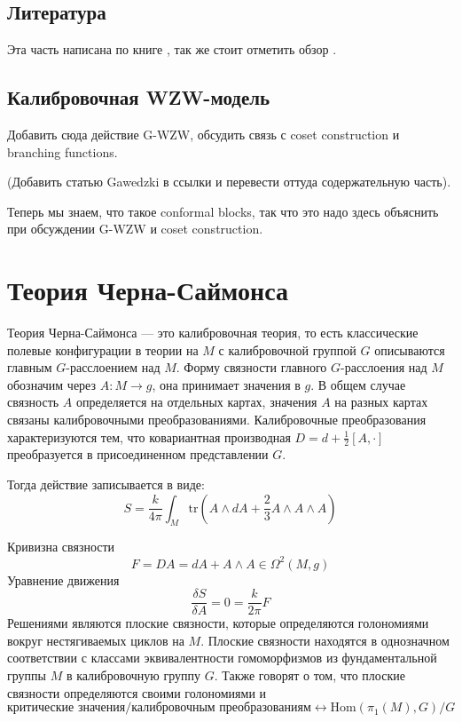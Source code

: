 \documentclass[a4paper,12pt]{article}
\theoremstyle{definition} \newtheorem{Def}{Definition}
\begin{document}
\subsection{Литература}
\label{sec:wzw-literature}

Эта часть написана по книге \cite{difrancesco1997cft}, так же стоит отметить обзор \cite{Walton:1999xc}.

\subsection{Калибровочная WZW-модель}
\label{sec:gauged-wzw}

Добавить сюда действие G-WZW, обсудить связь с coset construction и branching functions.

(Добавить статью Gawedzki в ссылки и перевести оттуда содержательную часть).

Теперь мы знаем, что такое conformal blocks, так что это надо здесь объяснить при обсуждении G-WZW и coset construction.

\section{Теория Черна-Саймонса}
\label{sec:Chern-Simons}

Теория Черна-Саймонса --- это калибровочная теория, то есть классические полевые конфигурации в теории на $M$ с калибровочной группой $G$ описываются главным $G$-расслоением над $M$. Форму связности главного $G$-расслоения над $M$ обозначим через $A:M\to g$, она принимает значения в $g$. В общем случае связность $A$ определяется на отдельных картах, значения $A$ на разных картах связаны калибровочными преобразованиями. Калибровочные преобразования характеризуются тем, что ковариантная производная $D=d+\frac{1}{2}[A,\cdot]$ преобразуется в присоединенном представлении $G$. 

Тогда действие записывается в виде:
\begin{equation}
  \label{eq:1}
  S=\frac{k}{4\pi}\int_M \mathrm{tr}(A\wedge dA+\frac{2}{3}A\wedge A\wedge A)
\end{equation}


Кривизна связности
\begin{equation}
  \label{eq:2}
  F=DA=dA+A\wedge A\in \Omega^2(M,g)
\end{equation}
Уравнение движения
\begin{equation}
  \label{eq:3}
  \frac{\delta S}{\delta A}=0=\frac{k}{2\pi}F
\end{equation}
Решениями являются плоские связности, которые определяются голономиями вокруг нестягиваемых циклов на $M$. Плоские связности находятся в однозначном соответствии с классами эквивалентности гомоморфизмов из фундаментальной группы $M$ в калибровочную группу $G$. Также говорят о том, что плоские связности определяются своими голономиями и
\begin{equation}
  \label{eq:8}
  \mbox{критические значения}/\mbox{калибровочным преобразованиям}\leftrightarrow \mathrm{Hom}(\pi_1(M),G)/G
\end{equation}
\end{document}
